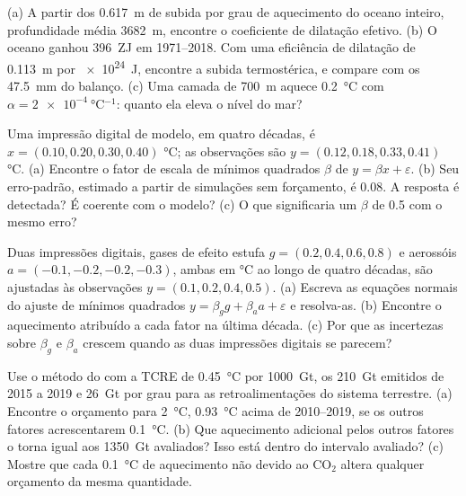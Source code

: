 \begin{exercise}[$\star\star$]\label{exo:b2:anthropogenic-climate-change:8}
(a) A partir dos \qty{0.617}{m} de subida por grau de aquecimento do oceano inteiro, profundidade média
\qty{3682}{m}, encontre o coeficiente de dilatação efetivo. (b) O oceano ganhou \qty{396}{ZJ} em
1971--2018. Com uma eficiência de dilatação de \qty{0.113}{m} por \qty{e24}{J}, encontre a subida
termostérica, e compare com os \qty{47.5}{mm} do balanço. (c) Uma camada de \qty{700}{m} aquece
\qty{0.2}{\celsius} com $\alpha = \qty{2e-4}{\celsius^{-1}}$: quanto ela eleva o nível do mar?
\end{exercise}

\begin{exercise}[$\star\star$]\label{exo:b2:anthropogenic-climate-change:9}
Uma impressão digital de modelo, em quatro décadas, é $x = (0.10, 0.20, 0.30, 0.40)$ \unit{\celsius}; as
observações são $y = (0.12, 0.18, 0.33, 0.41)$ \unit{\celsius}. (a) Encontre o fator de escala de mínimos quadrados
$\beta$ de $y = \beta x + \varepsilon$. (b) Seu erro-padrão, estimado a partir de simulações sem
forçamento, é \num{0.08}. A resposta é detectada? É coerente com o modelo? (c) O que
significaria um $\beta$ de 0.5 com o mesmo erro?
\end{exercise}

\begin{exercise}[$\star\star\star$]\label{exo:b2:anthropogenic-climate-change:10}
Duas impressões digitais, gases de efeito estufa $g = (0.2, 0.4, 0.6, 0.8)$ e aerossóis $a = (-0.1, -0.2,
-0.2, -0.3)$, ambas em \unit{\celsius} ao longo de quatro décadas, são ajustadas às observações $y = (0.1,
0.2, 0.4, 0.5)$. (a) Escreva as equações normais do ajuste de mínimos quadrados $y = \beta_g g + \beta_a a
+ \varepsilon$ e resolva-as. (b) Encontre o aquecimento atribuído a cada fator na última década.
(c) Por que as incertezas sobre $\beta_g$ e $\beta_a$ crescem quando as duas impressões digitais se parecem?
\end{exercise}

\begin{exercise}[$\star\star\star$]\label{exo:b2:anthropogenic-climate-change:11}
Use o método do  com a TCRE de \qty{0.45}{\celsius} por
\qty{1000}{Gt}, os \qty{210}{Gt} emitidos de 2015 a 2019 e \qty{26}{Gt} por grau para as
retroalimentações do sistema terrestre. (a) Encontre o orçamento para \qty{2}{\celsius}, \qty{0.93}{\celsius} acima de
2010--2019, se os outros fatores acrescentarem \qty{0.1}{\celsius}. (b) Que aquecimento adicional pelos outros
fatores o torna igual aos \qty{1350}{Gt} avaliados? Isso está dentro do intervalo avaliado? (c) Mostre
que cada \qty{0.1}{\celsius} de aquecimento não devido ao CO$_2$ altera qualquer orçamento da mesma quantidade.
\end{exercise}

